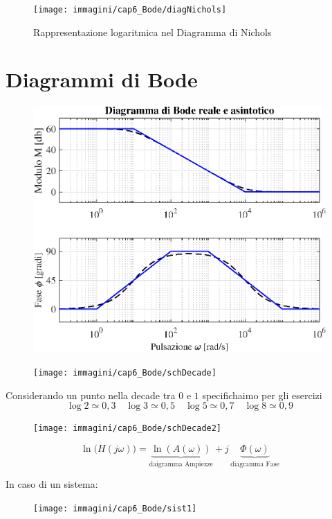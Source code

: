 \begin{figure}[H]
	\centering
	\texttt{[image: immagini/cap6\_Bode/diagNichols]}
	\caption{ Rappresentazione logaritmica nel Diagramma di Nichols  }
	\label{fig:diagNichols}
\end{figure}

\section{Diagrammi di Bode}
\begin{figure}[H]
	\centering
	\includegraphics[width=0.7\linewidth]{immagini/cap6_Bode/diagBode}
	\label{fig:diagBode}
\end{figure}


\begin{figure}[H]
	\centering
	\texttt{[image: immagini/cap6\_Bode/schDecade]}
	\label{fig:schDecade}
\end{figure}
Considerando un punto nella decade tra $ 0 $ e $ 1 $ specifichaimo per gli esercizi
\[ 
	\log 2 \simeq 0,3 \quad \log 3 \simeq 0,5 \quad\log 5 \simeq 0,7 \quad\log 8 \simeq 0,9 
 \]
\begin{figure}[H]
	\centering
	\texttt{[image: immagini/cap6\_Bode/schDecade2]}
	\label{fig:schDecade2}
\end{figure}

\[ 
	\ln \big(H(j\omega)\big) = \underbrace{\ln (A(\omega))}_{\text{daigramma Ampiezze}} + j\,\underbrace{\Phi (\omega)}_{\text{diagramma Fase}}
 \]
 
 In caso di un sistema:
 \begin{figure}[H]
 	\centering
 	\texttt{[image: immagini/cap6\_Bode/sist1]}
 	\label{fig:sist1}
 \end{figure}

